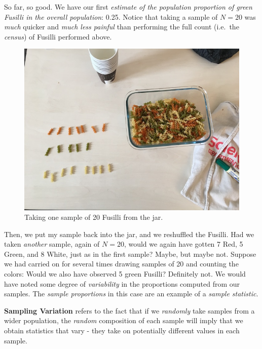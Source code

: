\documentclass[]{book}
\newenvironment{note}{\begin{tcolorbox}[colback=blue!5!white,colframe=blue!75!black]}{\end{tcolorbox}}
\begin{document}
So far, so good. We have our first \emph{estimate of the population proportion of green Fusilli in the overall population}: 0.25. Notice that taking a sample of \(N=20\) was \emph{much} quicker and \emph{much less painful} than performing the full count (i.e.~the \emph{census}) of Fusilli performed above.

\begin{figure}

{\centering \includegraphics[width=0.9\linewidth]{images/pasta5} 

}

\caption{Taking one sample of 20 Fusilli from the jar.}\label{fig:pasta5}
\end{figure}

Then, we put my sample back into the jar, and we reshuffled the Fusilli. Had we taken \emph{another} sample, again of \(N=20\), would we again have gotten 7 Red, 5 Green, and 8 White, just as in the first sample? Maybe, but maybe not. Suppose we had carried on for several times drawing samples of 20 and counting the colors: Would we also have observed 5 green Fusilli? Definitely not. We would have noted some degree of \emph{variability} in the proportions computed from our samples. The \emph{sample proportions} in this case are an example of a \emph{sample statistic}.

\begin{note}
\textbf{Sampling Variation} refers to the fact that if we
\emph{randomly} take samples from a wider population, the \emph{random}
composition of each sample will imply that we obtain statistics that
vary - they take on potentially different values in each sample.
\end{note}
\end{document}
